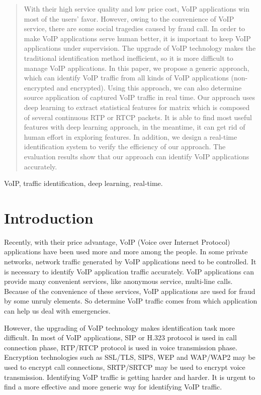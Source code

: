 \documentclass[conference]{IEEEtran}
\begin{document}
\begin{abstract}
  With their high service quality and low price cost, VoIP applications win most of the users' favor. However, owing to the convenience of VoIP service, there are some social tragedies caused by fraud call. In order to make VoIP applications serve human better, it is important to keep VoIP applications under supervision. The upgrade of VoIP technology makes the traditional identification method inefficient, so it is more difficult to manage VoIP applications. In this paper, we propose a generic approach, which can identify VoIP traffic from all kinds of VoIP applications (non-encrypted and encrypted). Using this approach, we can also determine source application of captured VoIP traffic in real time. Our approach uses deep learning to extract statistical features for matrix which is composed of several continuous RTP or RTCP packets. It is able to find most useful features with deep learning approach, in the meantime, it can get rid of human effort in exploring features. In addition, we design a real-time identification system to verify the efficiency of our approach. The evaluation results show that our approach can identify VoIP applications accurately.
\end{abstract}

\begin{IEEEkeywords}
VoIP, traffic identification, deep learning, real-time.
\end{IEEEkeywords}

\section{Introduction}
\label{intro}
Recently, with their price advantage, VoIP (Voice over Internet Protocol) applications have been used more and more among the people. In some private networks, network traffic generated by VoIP applications need to be controlled. It is necessary to identify VoIP application traffic accurately. VoIP applications can provide many convenient services, like anonymous service, multi-line calls. Because of the convenience of these services, VoIP applications are used for fraud by some unruly elements. So determine VoIP traffic comes from which application can help us deal with emergencies.

However, the upgrading of VoIP technology makes identification task more difficult. In most of VoIP applications, SIP or H.323 protocol is used in call connection phase, RTP/RTCP protocol is used in voice transmission phase. Encryption technologies such as SSL/TLS, SIPS, WEP and WAP/WAP2 may be used to encrypt call connections, SRTP/SRTCP may be used to encrypt voice transmission. Identifying VoIP traffic is getting harder and harder. It is urgent to find a more effective and more generic way for identifying VoIP traffic.
\end{document}
